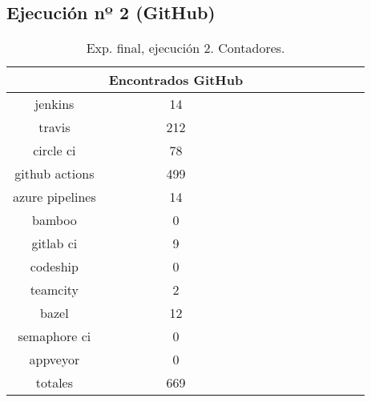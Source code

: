 \subsection{Ejecución nº 2 (GitHub)}
\begin{table}[h]
  \centering
  \caption{Exp. final, ejecución 2. Contadores.}
  \label{tab:tabla_f2_1}

\begin{footnotesize}
\renewcommand{\arraystretch}{1.5} %
\begin{tabular}{ccccccccccc}
  \hline
  {} &  Encontrados GitHub \\
  \hline
  jenkins         &                  14 \\
  travis          &                 212 \\
  circle ci       &                  78 \\
  github actions  &                 499 \\
  azure pipelines &                  14 \\
  bamboo          &                   0 \\
  gitlab ci       &                   9 \\
  codeship        &                   0 \\
  teamcity        &                   2 \\
  bazel           &                  12 \\
  semaphore ci    &                   0 \\
  appveyor        &                   0 \\
  totales         &                 669 \\
 \end{tabular}
\end{footnotesize}

\end{table}

